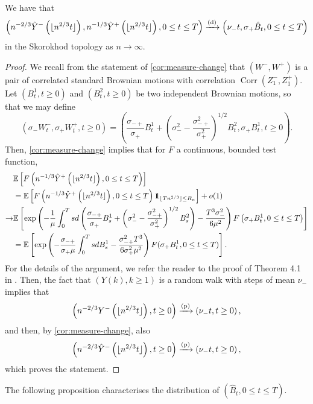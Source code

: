 \begin{proposition}\label{prop:convaftermeasurechange} 
 We have that
$$\left(n^{-2/3}\hat{Y}^-\left(\lfloor n^{2/3} t\rfloor\right), n^{-1/3}\hat{Y}^+\left(\lfloor  n^{2/3} t\rfloor\right), 0\leq t \leq T \right) \xrightarrow[]{\mathrm{(d)}} \left( \nu_- t, \sigma_+\hat{B}_t, 0 \leq t \leq T \right)$$
in the Skorokhod topology as $n\to \infty$.
\end{proposition}
\begin{proof}
 We recall from the statement of \cref{cor:measure-change} that $(W^-,W^+)$ is a pair of correlated standard Brownian motions with correlation $\operatorname{Corr}(Z_1^-,Z_1^+)$. 
Let $(B^1_t,t\geq 0)$ and $(B^2_t,t\geq 0)$ be two independent Brownian motions, so that we may define $$(\sigma_-W^-_t,\sigma_+W^+_t,t\geq 0)=\left(\frac{\sigma_{-+}}{\sigma_+}B_t^1+\left(\sigma_-^2-\frac{\sigma_{-+}^2}{\sigma_+^2}\right)^{1/2} B_t^2, \sigma_+ B_t^1, t\geq 0\right).$$ 
 Then, \cref{cor:measure-change} implies that for $F$ a continuous, bounded test function, 
 \begin{align*}&\E\left[F\left(n^{-1/3}\hat{Y}^+\left(\lfloor n^{2/3}t\rfloor\right), 0\leq t \leq T \right) \right]\\
 &=\E\left[F\left(n^{-1/3}\hat{Y}^+\left(\lfloor n^{2/3}t\rfloor\right), 0\leq t \leq T \right)\one_{\lfloor Tn^{2/3}\rfloor \leq R_n} \right]+o(1)
 \\\to& \E\left[\exp\left(-\frac{1}{\mu}\int_0^Tsd\left(\frac{\sigma_{-+}}{\sigma_+}B_s^1+\left(\sigma_-^2-\frac{\sigma_{-+}^2}{\sigma_+^2}\right)^{1/2}B_s^2\right) - \frac{T^3 \sigma_-^2}{6\mu^2}\right) F\left(\sigma_+ B_t^1, 0\leq t \leq T\right)\right]\\
 &=\E\left[\exp\left(-\frac{\sigma_{-+}}{\sigma_+ \mu} \int_0^T s dB^1_s -\frac{\sigma_{-+}^2 T^3}{6\sigma_+^2 \mu^2}\right)F(\sigma_+ B^1_t,   0\leq t \leq T)\right].\end{align*}
 For the details of the argument, we refer the reader to the proof of Theorem 4.1 in \cite{conchon--kerjanStableGraphMetric2020}. Then, the fact that $(Y(k),k\geq 1)$ is a random walk with steps of mean $\nu_-$ implies that
 $$\left(n^{-2/3}Y^-\left(\lfloor n^{2/3}t\rfloor\right),t\geq 0\right)\xrightarrow[]{\mathrm{(p)}}\left(\nu_- t,t\geq 0\right),$$
 and then, by \cref{cor:measure-change}, also 
 $$\left(n^{-2/3}\hat{Y}^-\left(\lfloor n^{2/3}t\rfloor\right),t\geq 0\right)\xrightarrow[]{\mathrm{(p)}}\left(\nu_- t,t\geq 0\right),$$
 which proves the statement.
 \end{proof}
 The following proposition characterises the distribution of $(\hat{B}_t, {0\leq t\leq T})$.
